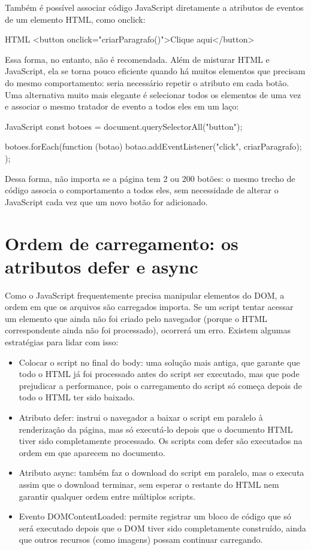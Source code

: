 Também é possível associar código JavaScript diretamente a atributos de eventos de um elemento HTML, como onclick:

\begin{codebox}{HTML}
<button onclick="criarParagrafo()">Clique aqui</button>
\end{codebox}

Essa forma, no entanto, não é recomendada. Além de misturar HTML e JavaScript, ela se torna pouco eficiente quando há muitos elementos que precisam do mesmo comportamento: seria necessário repetir o atributo em cada botão. Uma alternativa muito mais elegante é selecionar todos os elementos de uma vez e associar o mesmo tratador de evento a todos eles em um laço:

\begin{codebox}{JavaScript}
const botoes = document.querySelectorAll("button");

botoes.forEach(function (botao) {
  botao.addEventListener("click", criarParagrafo);
});
\end{codebox}

Dessa forma, não importa se a página tem 2 ou 200 botões: o mesmo trecho de código associa o comportamento a todos eles, sem necessidade de alterar o JavaScript cada vez que um novo botão for adicionado.

\section{Ordem de carregamento: os atributos defer e async}

Como o JavaScript frequentemente precisa manipular elementos do DOM, a ordem em que os arquivos são carregados importa. Se um script tentar acessar um elemento que ainda não foi criado pelo navegador (porque o HTML correspondente ainda não foi processado), ocorrerá um erro. Existem algumas estratégias para lidar com isso:

\begin{itemize}
  \item Colocar o script no final do body: uma solução mais antiga, que garante que todo o HTML já foi processado antes do script ser executado, mas que pode prejudicar a performance, pois o carregamento do script só começa depois de todo o HTML ter sido baixado.
  \item Atributo defer: instrui o navegador a baixar o script em paralelo à renderização da página, mas só executá-lo depois que o documento HTML tiver sido completamente processado. Os scripts com defer são executados na ordem em que aparecem no documento.
  \item Atributo async: também faz o download do script em paralelo, mas o executa assim que o download terminar, sem esperar o restante do HTML nem garantir qualquer ordem entre múltiplos scripts.
  \item Evento DOMContentLoaded: permite registrar um bloco de código que só será executado depois que o DOM tiver sido completamente construído, ainda que outros recursos (como imagens) possam continuar carregando.
\end{itemize}

